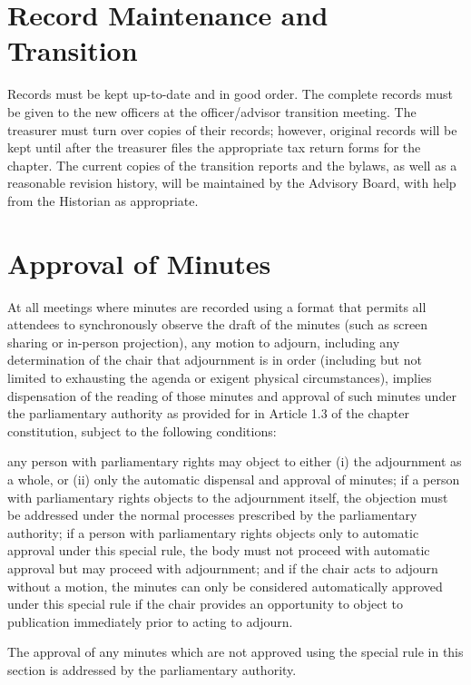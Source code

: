 \section{Record Maintenance and Transition}
Records must be kept up-to-date and in good order.
The complete records must be given to the new officers at the officer/advisor transition meeting.
The treasurer must turn over copies of their records; however, original records will be kept until after the treasurer files the appropriate tax return forms for the chapter.
The current copies of the transition reports and the bylaws, as well as a reasonable revision history, will be maintained by the Advisory Board, with help from the Historian as appropriate.

\section{Approval of Minutes}
\label{sec:approvalofminutes} At all meetings where minutes are recorded using a format that permits all attendees to synchronously observe the draft of the minutes (such as screen sharing or in-person projection), any motion to adjourn, including any determination of the chair that adjournment is in order (including but not limited to exhausting the agenda or exigent physical circumstances), implies dispensation of the reading of those minutes and approval of such minutes under the parliamentary authority as provided for in Article 1.3 of the chapter constitution, subject to the following conditions:

\begin{enumsubsection}
\itemnotoc any person with parliamentary rights may object to either (i) the adjournment as a whole, or (ii) only the automatic dispensal and approval of minutes;
\itemnotoc if a person with parliamentary rights objects to the adjournment itself, the objection must be addressed under the normal processes prescribed by the parliamentary authority;
\itemnotoc if a person with parliamentary rights objects only to automatic approval under this special rule, the body must not proceed with automatic approval but may proceed with adjournment; and
\itemnotoc if the chair acts to adjourn without a motion, the minutes can only be considered automatically approved under this special rule if the chair provides an opportunity to object to publication immediately prior to acting to adjourn.
\end{enumsubsection}
The approval of any minutes which are not approved using the special rule in this section is addressed by the parliamentary authority.

